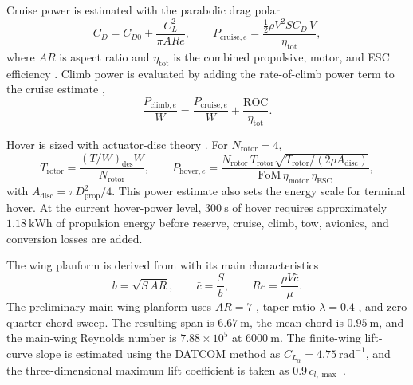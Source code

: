 Cruise power is estimated with the parabolic drag polar
\cite{Anderson2016Fundamentals, Raymer2018}
\begin{equation}
    C_D = C_{D0} + \frac{C_L^2}{\pi AR e},
    \qquad
    P_{\mathrm{cruise},e}
    = \frac{\frac{1}{2}\rho V^2 S C_D\, V}{\eta_\mathrm{tot}},
    \label{eq:ppa_cruise_power}
\end{equation}
where \(AR\) is aspect ratio and \(\eta_\mathrm{tot}\) is the combined
propulsive, motor, and ESC efficiency \cite{Tyan2017}. Climb power is evaluated
by adding the rate-of-climb power term to the cruise estimate
\cite{Anderson2017AircraftDesign},
\begin{equation}
    \frac{P_{\mathrm{climb},e}}{W}
    =
    \frac{P_{\mathrm{cruise},e}}{W}
    +
    \frac{\mathrm{ROC}}{\eta_\mathrm{tot}}.
    \label{eq:ppa_climb_power}
\end{equation}
 
Hover is sized with actuator-disc theory \cite{Leishman2006}. For
\(N_\mathrm{rotor}=4\),
\begin{equation}
    T_\mathrm{rotor} =
    \frac{(T/W)_\mathrm{des}W}{N_\mathrm{rotor}},
    \qquad
    P_{\mathrm{hover},e}
    =
    \frac{N_\mathrm{rotor}\,T_\mathrm{rotor}
    \sqrt{T_\mathrm{rotor}/(2\rho A_\mathrm{disc})}}
    {\mathrm{FoM}\,\eta_\mathrm{motor}\,\eta_\mathrm{ESC}},
    \label{eq:ppa_hover_power}
\end{equation}
with \(A_\mathrm{disc}=\pi D_\mathrm{prop}^{2}/4\). This power estimate also
sets the energy scale for terminal hover. At the current hover-power level,
\(300~\mathrm{s}\) of hover requires approximately \(1.18~\mathrm{kWh}\) of
propulsion energy before reserve, cruise, climb, tow, avionics, and conversion losses are added.
 
The wing planform is derived from \cite{Raymer2018} with its main characteristics
\begin{equation}
    b=\sqrt{S\, AR},
    \qquad
    \bar{c}=\frac{S}{b},
    \qquad
    Re=\frac{\rho V\bar{c}}{\mu}.
    \label{eq:ppa_geometry_reynolds}
\end{equation}
The preliminary main-wing planform uses \(AR=7\) \cite{Tyan2017}, taper ratio \(\lambda=0.4\) \cite{Raymer2018}, and zero
quarter-chord sweep. The resulting span is \(6.67~\mathrm{m}\), the mean chord
is \(0.95~\mathrm{m}\), and the main-wing Reynolds number is
\(7.88\times10^5\) at \(6000~\mathrm{m}\). The finite-wing lift-curve slope is
estimated using the DATCOM method
\cite{USAFDATCOM1978} as
\(C_{L_\alpha}=4.75~\mathrm{rad^{-1}}\), and the three-dimensional maximum
lift coefficient is taken as \(0.9\,c_{l,\max}\) \cite{Raymer2018}.


